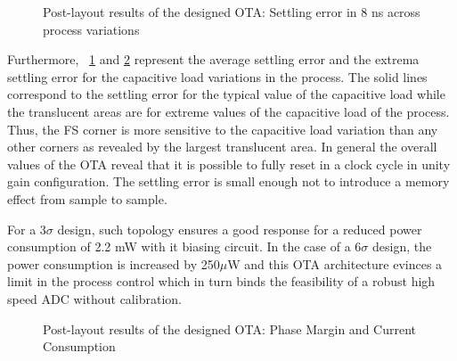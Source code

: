\begin{figure}[htp]
    \centering
    \begin{subfigure}[b]{0.48\textwidth}
        \resizebox{\textwidth}{!}{
            
        }
        \label{fig:ota_error_400fF_temp_corners}
    \end{subfigure}
    \begin{subfigure}[b]{0.48\textwidth}
        \resizebox{\textwidth}{!}{
            
        }
        \label{fig:ota_error_1pF_temp_corners}
    \end{subfigure}
    \caption{Post-layout results of the designed OTA: Settling error in 8 ns across process variations}
    \label{fig:ota_result-2}
\end{figure}

Furthermore, \figurename~\ref{fig:ota_error_400fF_temp_corners} and \ref{fig:ota_error_1pF_temp_corners} represent the average settling error and the extrema settling error for the capacitive load variations in the process. The solid lines correspond to the settling error for the typical value of the capacitive load while the translucent areas are for extreme values of the capacitive load of the process. Thus, the FS corner is more sensitive to the capacitive load variation than any other corners as revealed by the largest translucent area. In general the overall values of the OTA reveal that it is possible to fully reset in a clock cycle in unity gain configuration. The settling error is small enough not to introduce a memory effect from sample to sample.

For a \(3\sigma \) design, such topology ensures a good response for a reduced power consumption of 2.2 mW with it biasing circuit. In the case of a \(6\sigma \) design, the power consumption is increased by 250\(\mu \)W and this OTA architecture evinces a limit in the process control which in turn binds the feasibility of a robust high speed ADC without calibration.

\begin{figure}[htp]
    \centering
    \begin{subfigure}[b]{0.48\textwidth}
        \resizebox{\textwidth}{!}{
            
        }
        \label{fig:ota_pm_temp_corners}
    \end{subfigure}
    \begin{subfigure}[b]{0.48\textwidth}
        \resizebox{\textwidth}{!}{
            
        }
        \label{fig:ota_pow_temp_corners}
    \end{subfigure}
    \caption{Post-layout results of the designed OTA: Phase Margin and Current Consumption}
    \label{fig:ota_result-3}
\end{figure}

